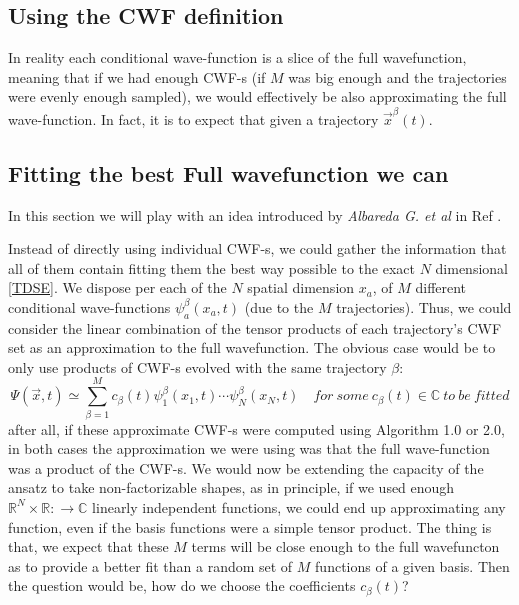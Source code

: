 \documentclass[11pt, a4paper]{article} %
\newcommand{\R}{\mathbb{R}} %
\newcommand{\C}{\mathbb{C}}
\begin{document}
\subsection{Using the CWF definition}
In reality each conditional wave-function is a slice of the full wavefunction, meaning that if we had enough CWF-s (if $M$ was big enough and the trajectories were evenly enough sampled), we would effectively be also approximating the full wave-function. In fact, it is to expect that given a trajectory $\vec{x}^\beta(t)$. %

\subsection{Fitting the best Full wavefunction we can}

In this section we will play with an idea introduced by {\em Albareda G. et al} in Ref \cite{Albareda}.


Instead of directly using individual CWF-s, we could gather the information that all of them contain fitting them the best way possible to the exact $N$ dimensional \ref{TDSE}. We dispose per each of the $N$ spatial dimension $x_a$, of $M$ different conditional wave-functions $\psi^\beta_a(x_a,t)$ (due to the $M$ trajectories). Thus, we could consider the linear combination of the tensor products of each trajectory's CWF set as an approximation to the full wavefunction. The obvious case would be to only use products of CWF-s evolved with the same trajectory $\beta$:
$$
\Psi(\vec{x},t)\simeq \sum_{\beta=1}^{M} c_\beta(t) \psi^\beta_1(x_1,t)\cdots \psi^\beta_N(x_N,t) \quad for\ some\ c_\beta(t)\in \C\ to\ be\ fitted
$$
after all, if these approximate CWF-s were computed using Algorithm 1.0 or 2.0, in both cases the approximation we were using was that the full wave-function was a product of the CWF-s. We would now be extending the capacity of the ansatz to take non-factorizable shapes, as in principle, if we used enough $\R^N \times \R:\rightarrow \C$ linearly independent functions, we could end up approximating any function, even if the basis functions were a simple tensor product. The thing is that, we expect that these $M$ terms will be close enough to the full wavefuncton as to provide a better fit than a random set of $M$ functions of a given basis. Then the question would be, how do we choose the coefficients $c_\beta (t)$?
\end{document}
